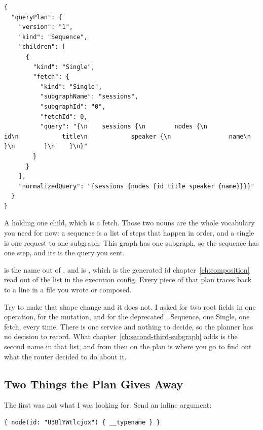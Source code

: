 \begin{verbatim}
{
  "queryPlan": {
    "version": "1",
    "kind": "Sequence",
    "children": [
      {
        "kind": "Single",
        "fetch": {
          "kind": "Single",
          "subgraphName": "sessions",
          "subgraphId": "0",
          "fetchId": 0,
          "query": "{\n    sessions {\n        nodes {\n            id\n            title\n            speaker {\n                name\n            }\n        }\n    }\n}"
        }
      }
    ],
    "normalizedQuery": "{sessions {nodes {id title speaker {name}}}}"
  }
}
\end{verbatim}

%
A  holding one child, which is a  fetch. Those two
nouns are the whole vocabulary you need for now: a sequence is a list of steps
that happen in order, and a single is one request to one subgraph. This graph
has one subgraph, so the sequence has one step, and its  is the
query you sent.

%
 is the name out of , and
 is , which is the generated id
chapter~\ref{ch:composition} read out of the  list in the
execution config. Every piece of that plan traces back to a line in a file you
wrote or composed.

%
Try to make that shape change and it does not. I asked for two root
fields in one operation, for the mutation, and for the deprecated
. Sequence, one Single, one fetch, every time. There is one
service and nothing to decide, so the planner has no decision to record. What
chapter~\ref{ch:second-third-subgraph} adds is the second name in that list, and
from then on the plan is where you go to find out what the router decided to do
about it.

\subsection{Two Things the Plan Gives Away}

%
The first was not what I was looking for. Send an inline argument:

\begin{verbatim}
{ node(id: "U3BlYWtlcjox") { __typename } }
\end{verbatim}

